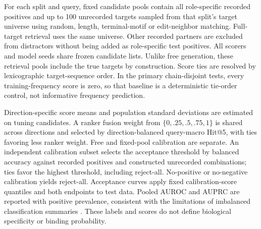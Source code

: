 \documentclass[12pt]{article}
\begin{document}
For each split and query, fixed candidate pools contain all role-specific
recorded positives and up to 100 unrecorded targets sampled from that split's
target universe using random, length, terminal-motif or edit-neighbor matching.
Full-target retrieval uses the same universe. Other recorded partners are
excluded from distractors without being added as role-specific test positives.
All scorers and model seeds share frozen candidate lists. Unlike free generation,
these retrieval pools include the true targets by construction.
Score ties are resolved by lexicographic target-sequence order. In the primary
chain-disjoint tests, every training-frequency score is zero, so that baseline
is a deterministic tie-order control, not informative frequency prediction.

Direction-specific score means and population standard deviations are estimated
on tuning candidates. A ranker fusion weight from $\{0,.25,.5,.75,1\}$ is shared
across directions and selected by direction-balanced query-macro Hit@5, with
ties favoring less ranker weight. Free and fixed-pool calibration are separate.
An independent calibration subset selects the acceptance threshold by balanced
accuracy against recorded positives and constructed unrecorded combinations;
ties favor the highest threshold, including reject-all. No-positive or
no-negative calibration yields reject-all. Acceptance curves apply fixed
calibration-score quantiles and both endpoints to test data. Pooled AUROC and
AUPRC are reported with positive prevalence, consistent with the limitations of
imbalanced classification summaries \cite{pr_metrics}. These labels and scores
do not define biological specificity or binding probability.
\end{document}
